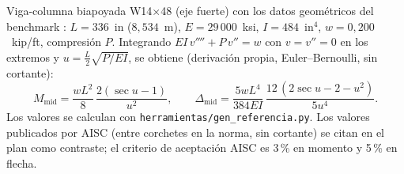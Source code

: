 Viga-columna biapoyada W14$\times$48 (eje fuerte) con los datos geométricos del benchmark \cite{aisc16}: $L=336$~in ($8{,}534$~m), $E=29\,000$~ksi, $I=484$~in$^4$, $w=0{,}200$~kip/ft, compresión $P$. Integrando $EI\,v''''+P\,v''=w$ con $v=v''=0$ en los extremos y $u=\tfrac{L}{2}\sqrt{P/EI}$, se obtiene (derivación propia, Euler--Bernoulli, sin cortante):
\[
M_\text{mid}=\frac{wL^2}{8}\,\frac{2(\sec u-1)}{u^2},\qquad
\Delta_\text{mid}=\frac{5wL^4}{384EI}\,\frac{12\,(2\sec u-2-u^2)}{5u^4}.
\]
Los valores se calculan con \texttt{herramientas/gen\_referencia.py}. Los valores publicados por AISC (entre corchetes en la norma, sin cortante) se citan en el plan como contraste; el criterio de aceptación AISC es 3\,\% en momento y 5\,\% en flecha.
